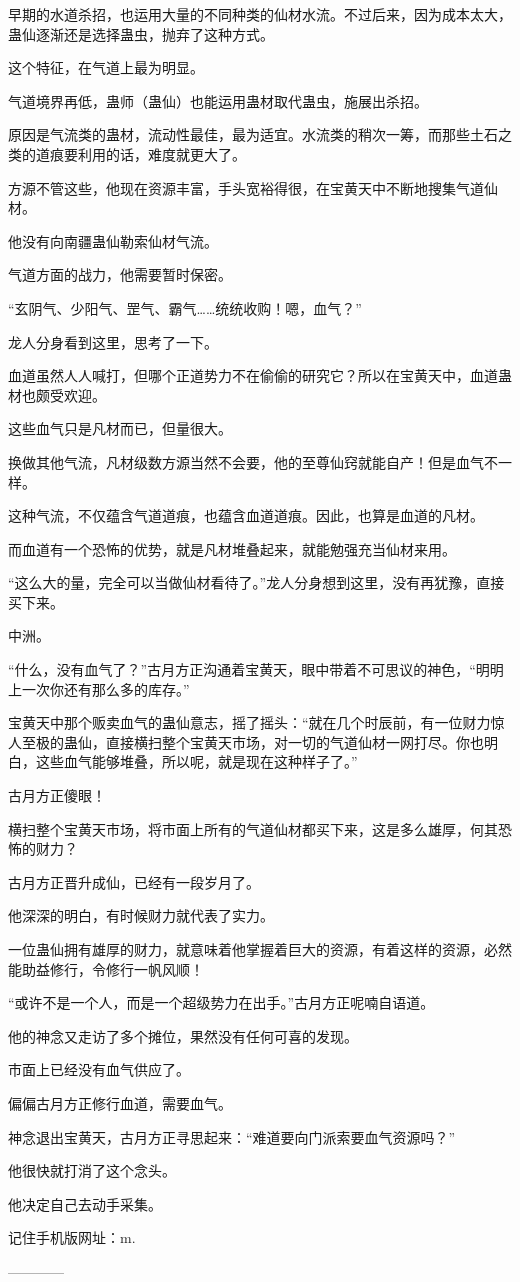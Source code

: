 \begin{this_body}
早期的水道杀招，也运用大量的不同种类的仙材水流。不过后来，因为成本太大，蛊仙逐渐还是选择蛊虫，抛弃了这种方式。

这个特征，在气道上最为明显。

气道境界再低，蛊师（蛊仙）也能运用蛊材取代蛊虫，施展出杀招。

原因是气流类的蛊材，流动性最佳，最为适宜。水流类的稍次一筹，而那些土石之类的道痕要利用的话，难度就更大了。

方源不管这些，他现在资源丰富，手头宽裕得很，在宝黄天中不断地搜集气道仙材。

他没有向南疆蛊仙勒索仙材气流。

气道方面的战力，他需要暂时保密。

“玄阴气、少阳气、罡气、霸气……统统收购！嗯，血气？”

龙人分身看到这里，思考了一下。

血道虽然人人喊打，但哪个正道势力不在偷偷的研究它？所以在宝黄天中，血道蛊材也颇受欢迎。

这些血气只是凡材而已，但量很大。

换做其他气流，凡材级数方源当然不会要，他的至尊仙窍就能自产！但是血气不一样。

这种气流，不仅蕴含气道道痕，也蕴含血道道痕。因此，也算是血道的凡材。

而血道有一个恐怖的优势，就是凡材堆叠起来，就能勉强充当仙材来用。

“这么大的量，完全可以当做仙材看待了。”龙人分身想到这里，没有再犹豫，直接买下来。

中洲。

“什么，没有血气了？”古月方正沟通着宝黄天，眼中带着不可思议的神色，“明明上一次你还有那么多的库存。”

宝黄天中那个贩卖血气的蛊仙意志，摇了摇头：“就在几个时辰前，有一位财力惊人至极的蛊仙，直接横扫整个宝黄天市场，对一切的气道仙材一网打尽。你也明白，这些血气能够堆叠，所以呢，就是现在这种样子了。”

古月方正傻眼！

横扫整个宝黄天市场，将市面上所有的气道仙材都买下来，这是多么雄厚，何其恐怖的财力？

古月方正晋升成仙，已经有一段岁月了。

他深深的明白，有时候财力就代表了实力。

一位蛊仙拥有雄厚的财力，就意味着他掌握着巨大的资源，有着这样的资源，必然能助益修行，令修行一帆风顺！

“或许不是一个人，而是一个超级势力在出手。”古月方正呢喃自语道。

他的神念又走访了多个摊位，果然没有任何可喜的发现。

市面上已经没有血气供应了。

偏偏古月方正修行血道，需要血气。

神念退出宝黄天，古月方正寻思起来：“难道要向门派索要血气资源吗？”

他很快就打消了这个念头。

他决定自己去动手采集。

记住手机版网址：m.

------------

\end{this_body}

